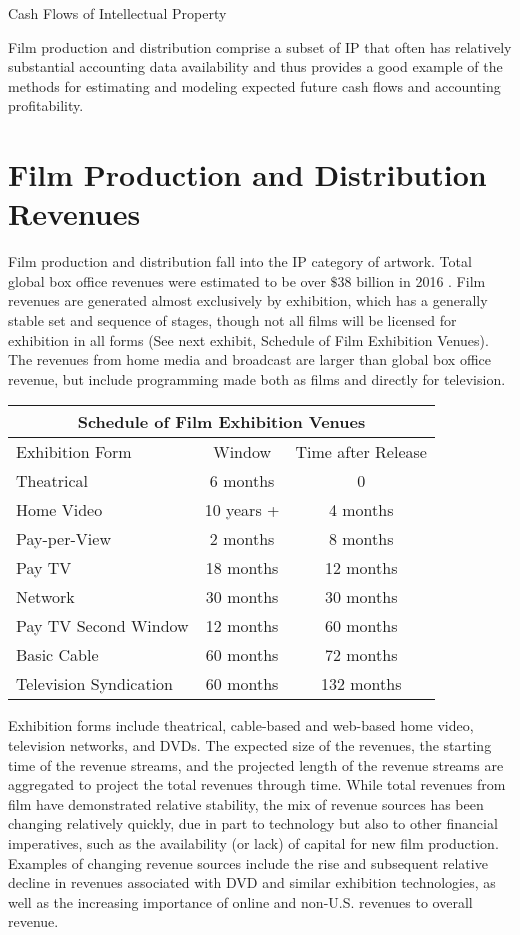 \documentclass[11pt]{article}
\begin{document}
Cash Flows of Intellectual Property

Film production and distribution comprise a subset of IP that often has relatively substantial accounting data availability and thus provides a good example of the methods for estimating and modeling expected future cash flows and accounting profitability.

\section*{Film Production and Distribution Revenues}
Film production and distribution fall into the IP category of artwork. Total global box office revenues were estimated to be over $\$ 38$ billion in 2016 . Film revenues are generated almost exclusively by exhibition, which has a generally stable set and sequence of stages, though not all films will be licensed for exhibition in all forms (See next exhibit, Schedule of Film Exhibition Venues). The revenues from home media and broadcast are larger than global box office revenue, but include programming made both as films and directly for television.

\begin{center}
\begin{tabular}{|lcc|}
\hline
\multicolumn{3}{c}{Schedule of Film Exhibition Venues} \\
\hline
Exhibition Form & Window & Time after Release \\
\hline
Theatrical & 6 months & 0 \\
Home Video & 10 years + & 4 months \\
Pay-per-View & 2 months & 8 months \\
Pay TV & 18 months & 12 months \\
Network & 30 months & 30 months \\
Pay TV Second Window & 12 months & 60 months \\
Basic Cable & 60 months & 72 months \\
Television Syndication & 60 months & 132 months \\
\hline
\end{tabular}
\end{center}

Exhibition forms include theatrical, cable-based and web-based home video, television networks, and DVDs. The expected size of the revenues, the starting time of the revenue streams, and the projected length of the revenue streams are aggregated to project the total revenues through time. While total revenues from film have demonstrated relative stability, the mix of revenue sources has been changing relatively quickly, due in part to technology but also to other financial imperatives, such as the availability (or lack) of capital for new film production. Examples of changing revenue sources include the rise and subsequent relative decline in revenues associated with DVD and similar exhibition technologies, as well as the increasing importance of online and non-U.S. revenues to overall revenue.
\end{document}

